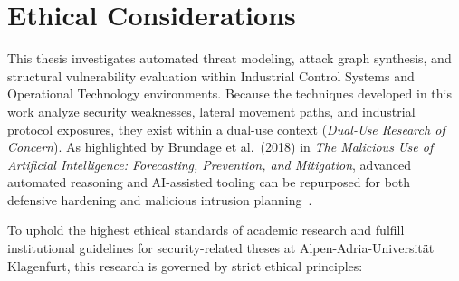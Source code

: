 \documentclass[target=mst,aauheader=aics,style=]{thud}
\begin{document}
\chapter{Ethical Considerations}
\label{chap:ethics}

This thesis investigates automated threat modeling, attack graph synthesis, and structural vulnerability evaluation within Industrial Control Systems and Operational Technology environments. Because the techniques developed in this work analyze security weaknesses, lateral movement paths, and industrial protocol exposures, they exist within a dual-use context (\textit{Dual-Use Research of Concern}). As highlighted by Brundage et al.\ (2018) in \textit{The Malicious Use of Artificial Intelligence: Forecasting, Prevention, and Mitigation}, advanced automated reasoning and AI-assisted tooling can be repurposed for both defensive hardening and malicious intrusion planning~\cite{Brundage2018}.

To uphold the highest ethical standards of academic research and fulfill institutional guidelines for security-related theses at Alpen-Adria-Universit{\"a}t Klagenfurt, this research is governed by strict ethical principles:
\end{document}
